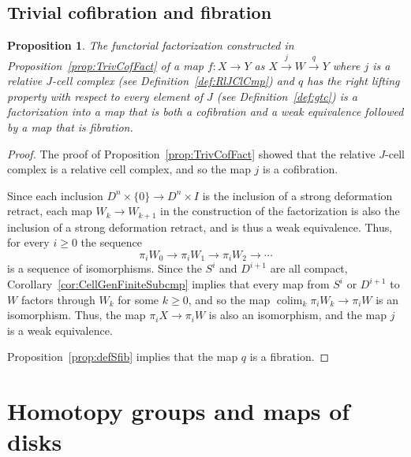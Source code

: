\documentclass{amsart}
\numberwithin{equation}{section}
\theoremstyle{slplain}
\newtheorem{prop}[equation]{Proposition}
\theoremstyle{definition}
\theoremstyle{remark}
\newcommand{\propref}{Proposition~\ref}
\newcommand{\defref}{Definition~\ref}
\DeclareMathOperator*{\colim}{colim}
\begin{document}
\subsection{Trivial cofibration and fibration}
\label{sec:TrCofFib}

\begin{prop}
  \label{prop:TrCofFib}
  The functorial factorization constructed in
  \propref{prop:TrivCofFact} of a map $f\colon X \to Y$ as $X
  \xrightarrow{j} W \xrightarrow{q} Y$ where $j$ is a relative
  $J$-cell complex (see \defref{def:RlJClCmp}) and $q$ has the right
  lifting property with respect to every element of $J$ (see
  \defref{def:gtc}) is a factorization into a map that is both a
  cofibration and a weak equivalence followed by a map that is
  fibration.
\end{prop}

\begin{proof}
  The proof of \propref{prop:TrivCofFact} showed that the relative
  $J$-cell complex is a relative cell complex, and so the map $j$ is a
  cofibration.

  Since each inclusion $D^{n}\times\{0\} \to D^{n}\times I$ is the
  inclusion of a strong deformation retract, each map $W_{k} \to
  W_{k+1}$ in the construction of the factorization is also the
  inclusion of a strong deformation retract, and is thus a weak
  equivalence.  Thus, for every $i \ge 0$ the sequence
  \begin{displaymath}
    \pi_{i} W_{0} \to \pi_{i} W_{1} \to \pi_{i} W_{2} \to \cdots
  \end{displaymath}
  is a sequence of isomorphisms.  Since the $S^{i}$ and $D^{i+1}$ are
  all compact, Corollary~\ref{cor:CellGenFiniteSubcmp} implies that every map
  from $S^{i}$ or $D^{i+1}$ to $W$ factors through $W_{k}$ for some $k
  \ge 0$, and so the map $\colim_{k} \pi_{i} W_{k} \to \pi_{i} W$ is
  an isomorphism.  Thus, the map $\pi_{i}X \to \pi_{i}W$ is also an
  isomorphism, and the map $j$ is a weak equivalence.

  \propref{prop:defSfib} implies that the map $q$ is a fibration.
\end{proof}

\section{Homotopy groups and maps of disks}
\label{sec:MpDsk}
\end{document}
